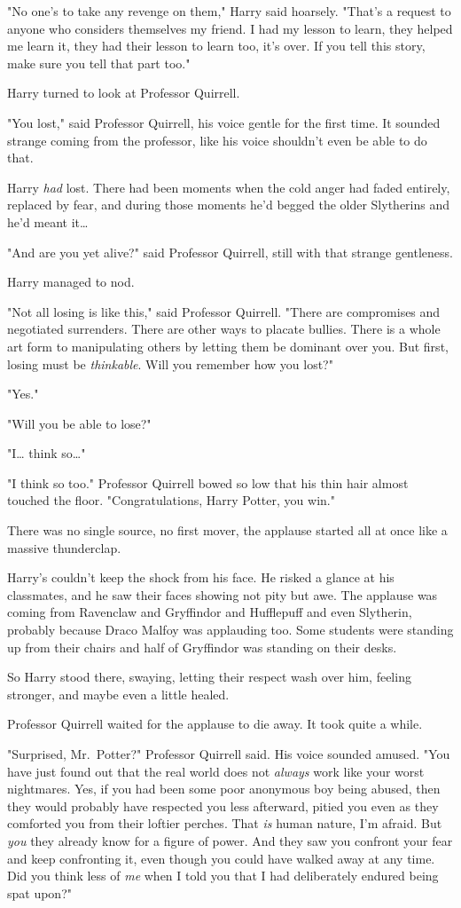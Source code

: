 "No one's to take any revenge on them," Harry said hoarsely. "That's a request to anyone who considers themselves my friend. I had my lesson to learn, they helped me learn it, they had their lesson to learn too, it's over. If you tell this story, make sure you tell that part too."

Harry turned to look at Professor Quirrell.

"You lost," said Professor Quirrell, his voice gentle for the first time. It sounded strange coming from the professor, like his voice shouldn't even be able to do that.

Harry \emph{had} lost. There had been moments when the cold anger had faded entirely, replaced by fear, and during those moments he'd begged the older Slytherins and he'd meant it{\ldots}

"And are you yet alive?" said Professor Quirrell, still with that strange gentleness.

Harry managed to nod.

"Not all losing is like this," said Professor Quirrell. "There are compromises and negotiated surrenders. There are other ways to placate bullies. There is a whole art form to manipulating others by letting them be dominant over you. But first, losing must be \emph{thinkable}. Will you remember how you lost?"

"Yes."

"Will you be able to lose?"

"I{\ldots} think so{\ldots}"

"I think so too." Professor Quirrell bowed so low that his thin hair almost touched the floor. "Congratulations, Harry Potter, you win."

There was no single source, no first mover, the applause started all at once like a massive thunderclap.

Harry's couldn't keep the shock from his face. He risked a glance at his classmates, and he saw their faces showing not pity but awe. The applause was coming from Ravenclaw and Gryffindor and Hufflepuff and even Slytherin, probably because Draco Malfoy was applauding too. Some students were standing up from their chairs and half of Gryffindor was standing on their desks.

So Harry stood there, swaying, letting their respect wash over him, feeling stronger, and maybe even a little healed.

Professor Quirrell waited for the applause to die away. It took quite a while.

"Surprised, Mr.~Potter?" Professor Quirrell said. His voice sounded amused. "You have just found out that the real world does not \emph{always} work like your worst nightmares. Yes, if you had been some poor anonymous boy being abused, then they would probably have respected you less afterward, pitied you even as they comforted you from their loftier perches. That \emph{is} human nature, I'm afraid. But \emph{you} they already know for a figure of power. And they saw you confront your fear and keep confronting it, even though you could have walked away at any time. Did you think less of \emph{me} when I told you that I had deliberately endured being spat upon?"

